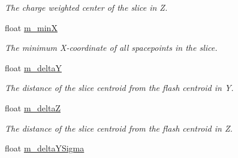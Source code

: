 \begin{DoxyCompactItemize}
\begin{DoxyCompactList}\small\item\em The charge weighted center of the slice in Z. \end{DoxyCompactList}\item 
\hypertarget{classflashmatch_1_1FlashMatchingTool_1_1SliceCandidate_a4e1e999e5c4b7eee8288778f5036c5ad}{float \hyperlink{classflashmatch_1_1FlashMatchingTool_1_1SliceCandidate_a4e1e999e5c4b7eee8288778f5036c5ad}{m\-\_\-min\-X}}\label{classflashmatch_1_1FlashMatchingTool_1_1SliceCandidate_a4e1e999e5c4b7eee8288778f5036c5ad}

\begin{DoxyCompactList}\small\item\em The minimum X-\/coordinate of all spacepoints in the slice. \end{DoxyCompactList}\item 
\hypertarget{classflashmatch_1_1FlashMatchingTool_1_1SliceCandidate_a142d8f66a16d966ae6802c1c4bfd308f}{float \hyperlink{classflashmatch_1_1FlashMatchingTool_1_1SliceCandidate_a142d8f66a16d966ae6802c1c4bfd308f}{m\-\_\-delta\-Y}}\label{classflashmatch_1_1FlashMatchingTool_1_1SliceCandidate_a142d8f66a16d966ae6802c1c4bfd308f}

\begin{DoxyCompactList}\small\item\em The distance of the slice centroid from the flash centroid in Y. \end{DoxyCompactList}\item 
\hypertarget{classflashmatch_1_1FlashMatchingTool_1_1SliceCandidate_a4cbc8329d6d0b0d91a6e355ba6575840}{float \hyperlink{classflashmatch_1_1FlashMatchingTool_1_1SliceCandidate_a4cbc8329d6d0b0d91a6e355ba6575840}{m\-\_\-delta\-Z}}\label{classflashmatch_1_1FlashMatchingTool_1_1SliceCandidate_a4cbc8329d6d0b0d91a6e355ba6575840}

\begin{DoxyCompactList}\small\item\em The distance of the slice centroid from the flash centroid in Z. \end{DoxyCompactList}\item 
\hypertarget{classflashmatch_1_1FlashMatchingTool_1_1SliceCandidate_a1b22351572f337e24d29009480f72ffc}{float \hyperlink{classflashmatch_1_1FlashMatchingTool_1_1SliceCandidate_a1b22351572f337e24d29009480f72ffc}{m\-\_\-delta\-Y\-Sigma}}\label{classflashmatch_1_1FlashMatchingTool_1_1SliceCandidate_a1b22351572f337e24d29009480f72ffc}


\end{DoxyCompactItemize}
